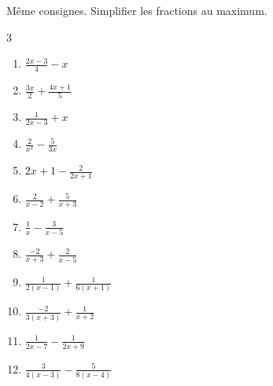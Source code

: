 \begin{exercise} \label{chapitre02:fractionalgebriques:memedenominateur}  
Même consignes. Simplifier les fractions au maximum.
\begin{multicols}{3}
\begin{enumerate}[label={$\Alph*(x)=$\rule{0pt}{1.8em}}, leftmargin=*] 
		\item $\frac{2x-3}{4}-x$
		\item $\frac{3x}{2}+\frac{4x+1}{5}$  
		\item $\frac{1}{2x-3}+x$
		\item $\frac{2}{x^2}-\frac{5}{3x}$ 
		\item $2x+1-\frac{2}{2x+1}$
		\item $\frac{2}{x-2}+\frac{5}{x+3}$
		\item $\frac{1}{x}-\frac{3}{x-5}$
		\item $\frac{-2}{x+3}+\frac{2}{x-5}$
		\item $\frac{1}{2(x-1)}+\frac{1}{6(x+1)}$
		\item $\frac{-2}{3(x+3)}+\frac{1}{x+2}$
		\item $\frac{1}{2x-7} -\frac{1}{2x+9}$
		\item $\frac{3}{4(x-3)}-\frac{5}{8(x-4)}$
	\end{enumerate}
\end{multicols}  
\end{exercise}



%	 

\newpage

